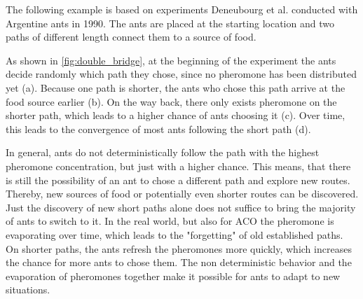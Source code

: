 The following example is based on experiments Deneubourg et al. \cite{deneubourg1990self} conducted with Argentine ants in 1990. The ants are placed at the starting location and two paths of different length connect them to a source of food.

As shown in \ref{fig:double_bridge}, at the beginning of the experiment the ants decide randomly which path they chose, since no pheromone has been distributed yet (a). Because one path is shorter, the ants who chose this path arrive at the food source earlier (b). On the way back, there only exists pheromone on the shorter path, which leads to a higher chance of ants choosing it (c). Over time, this leads to the convergence of most ants following the short path (d).

In general, ants do not deterministically follow the path with the highest pheromone concentration, but just with a higher chance. This means, that there is still the possibility of an ant to chose a different path and explore new routes. Thereby, new sources of food or potentially even shorter routes can be discovered. Just the discovery of new short paths alone does not suffice to bring the majority of ants to switch to it. In the real world, but also for ACO the pheromone is evaporating over time, which leads to the "forgetting" of old established paths. On shorter paths, the ants refresh the pheromones more quickly, which increases the chance for more ants to chose them. The non deterministic behavior and the evaporation of pheromones together make it possible for ants to adapt to new situations.

